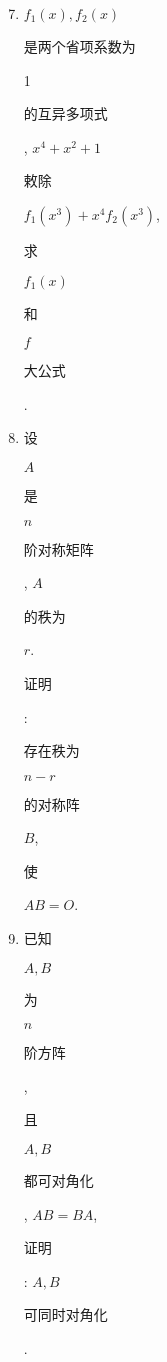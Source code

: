 \documentclass[10pt]{article}
\begin{document}
\begin{enumerate}
  \setcounter{enumi}{6}
  \item $f_{1}(x), f_{2}(x)$ \begin{CJK}{UTF8}{mj}是两个省项系数为\end{CJK} 1 \begin{CJK}{UTF8}{mj}的互异多项式\end{CJK}, $x^{4}+x^{2}+1$ \begin{CJK}{UTF8}{mj}敕除\end{CJK} $f_{1}\left(x^{3}\right)+x^{4} f_{2}\left(x^{3}\right)$, \begin{CJK}{UTF8}{mj}求\end{CJK} $f_{1}(x)$ \begin{CJK}{UTF8}{mj}和\end{CJK} $f$ \begin{CJK}{UTF8}{mj}大公式\end{CJK}.

  \item \begin{CJK}{UTF8}{mj}设\end{CJK} $A$ \begin{CJK}{UTF8}{mj}是\end{CJK} $n$ \begin{CJK}{UTF8}{mj}阶对称矩阵\end{CJK}, $A$ \begin{CJK}{UTF8}{mj}的秩为\end{CJK} $r$. \begin{CJK}{UTF8}{mj}证明\end{CJK}: \begin{CJK}{UTF8}{mj}存在秩为\end{CJK} $n-r$ \begin{CJK}{UTF8}{mj}的对称阵\end{CJK} $B$, \begin{CJK}{UTF8}{mj}使\end{CJK} $A B=O$.

  \item \begin{CJK}{UTF8}{mj}已知\end{CJK} $A, B$ \begin{CJK}{UTF8}{mj}为\end{CJK} $n$ \begin{CJK}{UTF8}{mj}阶方阵\end{CJK}, \begin{CJK}{UTF8}{mj}且\end{CJK} $A, B$ \begin{CJK}{UTF8}{mj}都可对角化\end{CJK}, $A B=B A$, \begin{CJK}{UTF8}{mj}证明\end{CJK}: $A, B$ \begin{CJK}{UTF8}{mj}可同时对角化\end{CJK}.


\end{enumerate}
\end{document}
